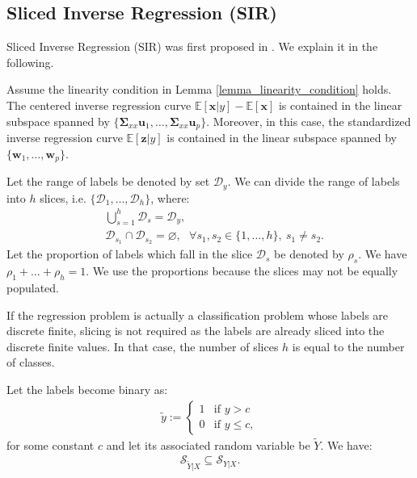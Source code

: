 \documentclass[lang=cn,10pt]{gorgeousnbook}
\numberwithin{equation}{section}%
\numberwithin{figure}{section}%
\begin{document}
\subsection{Sliced Inverse Regression (SIR)}

Sliced Inverse Regression (SIR) was first proposed in \cite{li1991sliced}. We explain it in the following. 

\begin{theorem}[]\label{theorem_SIR_inverseRegressionCurve_contained_in_subspace}
Assume the linearity condition in Lemma \ref{lemma_linearity_condition} holds.
The centered inverse regression curve $\mathbb{E}[\boldsymbol{x} | y] - \mathbb{E}[\boldsymbol{x}]$ is contained in the linear subspace spanned by $\{\boldsymbol{\Sigma}_{xx} \boldsymbol{u}_1, \dots, \boldsymbol{\Sigma}_{xx} \boldsymbol{u}_p\}$.
Moreover, in this case, the standardized inverse regression curve $\mathbb{E}[\boldsymbol{z} | y]$ is contained in the linear subspace spanned by $\{\boldsymbol{w}_1, \dots, \boldsymbol{w}_p\}$.
\end{theorem}

\begin{definition}
Let the range of labels be denoted by set $\mathcal{D}_y$.
We can divide the range of labels into $h$ slices, i.e. $\{\mathcal{D}_1, \dots, \mathcal{D}_h\}$, where:
\begin{align*}
& \bigcup_{s=1}^h \mathcal{D}_s = \mathcal{D}_y, \\
& \mathcal{D}_{s_1} \cap \mathcal{D}_{s_2} = \varnothing, ~~~ \forall s_1,s_2 \in \{1, \dots, h\}, ~ s_1 \neq s_2.
\end{align*}
Let the proportion of labels which fall in the slice $\mathcal{D}_s$ be denoted by $\rho_s$. We have $\rho_1 + \dots + \rho_h = 1$. We use the proportions because the slices may not be equally populated. 
\end{definition}

If the regression problem is actually a classification problem whose labels are discrete finite, slicing is not required as the labels are already sliced into the discrete finite values. In that case, the number of slices $h$ is equal to the number of classes. 

\begin{lemma}\label{lemma_central_subspace_binary_labels}
Let the labels become binary as:
\begin{align*}
\widetilde{y} := 
\left\{
    \begin{array}{ll}
        1 & \mbox{if } y > c \\
        0 & \mbox{if } y \leq c,
    \end{array}
\right.
\end{align*}
for some constant $c$ and let its associated random variable be $\widetilde{Y}$. We have:
\begin{align}\label{equation_Y_binary_subspace_subset}
\mathcal{S}_{\widetilde{Y}|X} \subseteq \mathcal{S}_{Y|X}.
\end{align}
\end{lemma}
\end{document}

